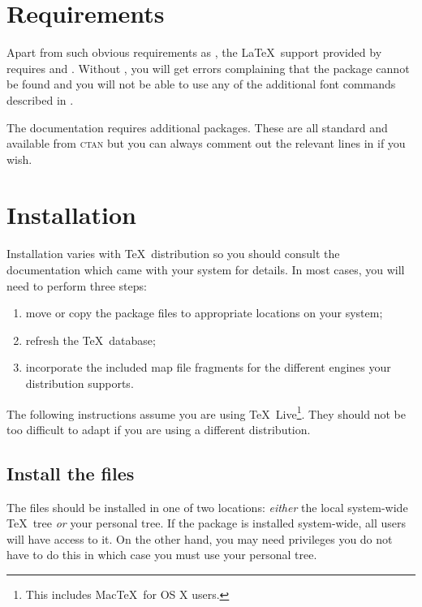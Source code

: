 \documentclass[11pt,british]{article}
\begin{document}
\section{Requirements}

Apart from such obvious requirements as \LaTeXe, the \LaTeX\ support provided by  requires  and . Without , you will get errors complaining that the package cannot be found and you will not be able to use any of the additional font commands described in .

The documentation requires additional packages. These are all standard and available from \textsc{ctan} but you can always comment out the relevant lines in  if you wish.

\section{Installation}

Installation varies with \TeX\ distribution so you should consult the documentation which came with your system for details. In most cases, you will need to perform three steps:
		\begin{enumerate}
			\item move or copy the package files to appropriate locations on your system;
			\item refresh the \TeX\ database;
			\item incorporate the included map file fragments for the different engines your distribution supports.
		\end{enumerate}

The following instructions assume you are using \TeX~Live\footnote{This includes Mac\TeX\ for OS X users.}. They should not be too difficult to adapt if you are using a different distribution.

\subsection{Install the files}

The files should be installed in one of two locations: \emph{either} the local system-wide \TeX\ tree \emph{or} your personal tree. If the package is installed system-wide, all users will have access to it. On the other hand, you may need privileges you do not have to do this in which case you must use your personal tree.
\end{document}
